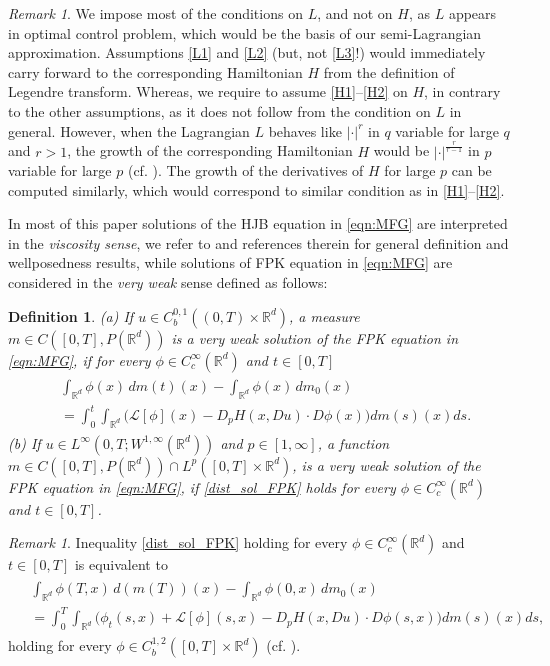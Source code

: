\documentclass[a4paper,  twoside, 10pt, leqno]{amsart}
\newcommand{\rd}{\mathbb{R}^d}
\newtheorem{definition}[thm]{Definition}
\theoremstyle{remark}
\newtheorem{remark}[thm]{Remark}
\theoremstyle{definition}
\begin{document}
\begin{remark}
We impose most of the conditions on $L$, and not on $H$, as $L$ appears in optimal control problem, which would be the basis of our semi-Lagrangian approximation. Assumptions \ref{L1} and \ref{L2} (but, not \ref{L3}!) would immediately carry forward to the corresponding Hamiltonian $H$ from the definition of Legendre transform. Whereas, we require to assume \ref{H1}--\ref{H2} on $H$, in contrary to the other assumptions, as it does not follow from the condition on $L$ in general. However, when the Lagrangian $L$ behaves like $|\cdot|^{r}$ in $q$ variable for large $q$ and $r>1$, the growth of the corresponding Hamiltonian $H$ would be $|\cdot|^{\frac{r}{r-1}}$ in $p$ variable for large $p$ (cf. \cite[Proposition 2.1]{MR3285897}). The growth of the derivatives of $H$ for large $p$ can be computed similarly, which would correspond to  similar condition as in \ref{H1}--\ref{H2}. 
\end{remark}


In  most of this paper solutions of the HJB equation in \eqref{eqn:MFG} are interpreted in the \textit{viscosity sense}, we refer to \cite{MR2129093} and references therein for general definition and wellposedness results, while solutions  of FPK equation in \eqref{eqn:MFG} are considered in the \textit{very weak} sense defined as follows:
\begin{definition}\label{def:weak-sol-FPK}
(a) If $u\in C^{0,1}_b((0,T)\times\rd)$,
a measure $m\in C([0,T],P(\rd))$ is a very weak solution of the FPK equation in \eqref{eqn:MFG}, if for every $\phi\in C_c^{\infty}(\rd)$ and $t\in[0,T]$ 
\begin{align}\label{dist_sol_FPK}
\begin{split}
&\int_{\rd} \phi(x) \,dm(t)(x) -\int_{\rd} \phi(x) \,dm_0(x)   \\ &= \int_{0}^t \int_{\rd} \Big(\mathcal{L}[\phi](x) -D_pH(x,Du)\cdot D\phi(x)\Big) dm(s)(x)ds. 
\end{split}
\end{align} 
(b) If $u\in L^\infty(0,T; W^{1,\infty}(\rd))$ and $p\in [1,\infty]$, a function $m\in C([0,T],P(\rd))\cap L^p([0,T]\times \rd)$,  is a very weak solution of the FPK equation in \eqref{eqn:MFG}, if \eqref{dist_sol_FPK} holds for every $\phi\in C_c^{\infty}(\rd)$ and $t\in[0,T]$.
\end{definition}

\begin{remark}\label{rem:defn-weaksol}
Inequality \eqref{dist_sol_FPK} holding for every $\phi\in C_c^{\infty}(\rd)$ and $t\in[0,T]$ is equivalent to 
\begin{align*}%
\begin{split}
&\int_{\rd} \phi(T,x) \,d(m(T))(x) -\int_{\rd} \phi(0,x) \,dm_0(x)   \\ &= \int_{0}^T \int_{\rd} \Big(\phi_t(s,x) + \mathcal{L}[\phi](s,x) -D_pH(x,Du)\cdot D\phi(s,x)\Big) dm(s)(x)ds, 
\end{split}
\end{align*}
holding for every $\phi\in C^{1,2}_b([0,T]\times \rd)$  (cf. \cite[Lemma 6.1]{Espen-Indra-Milosz-2020}).
\end{remark}
\end{document}

